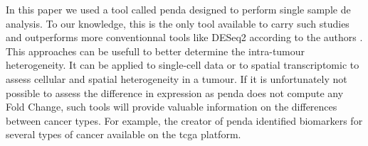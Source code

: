 In this paper we used a tool called \acrlong{penda} designed to perform single sample \acrlong{de} analysis.
To our knowledge, this is the only tool available to carry such studies and outperforms more conventionnal tools like DESeq2 according to the authors \cite*{Richard2020}.
This approaches can be usefull to better determine the intra-tumour heterogeneity.
It can be applied to single-cell data or to spatial transcriptomic to assess cellular and spatial heterogeneity in a tumour.
If it is unfortunately not possible to assess the difference in expression as \acrshort{penda} does not compute any Fold Change, such tools will provide valuable information on the differences between cancer types.
For example, the creator of \acrshort{penda} identified biomarkers for several types of cancer available on the \acrshort{tcga} platform.